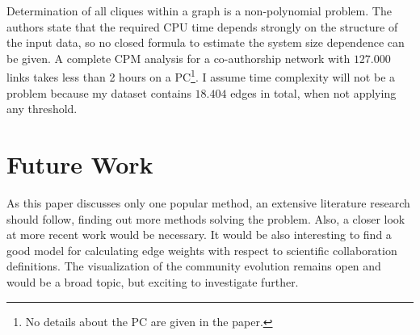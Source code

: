 \documentclass[runningheads,a4paper]{llncs}
\begin{document}
Determination of all cliques within a graph is a non-polynomial problem.
The authors state that the required CPU time depends strongly on the structure of the input data, so no closed formula to estimate the system size dependence can be given.
A complete CPM analysis for a co-authorship network with $127.000$ links takes less than 2 hours on a PC\footnote{No details about the PC are given in the paper.}.
I assume time complexity will not be a problem because my dataset contains $18.404$ edges in total, when not applying any threshold.

\section{Future Work}
As this paper discusses only one popular method, an extensive literature research should follow, finding out more methods solving the problem. Also, a closer look at more recent work would be necessary. It would be also interesting to find a good model for calculating edge weights with respect to scientific collaboration definitions. The visualization of the community evolution remains open and would be a broad topic, but exciting to investigate further.

{
	
	
}
\end{document}
